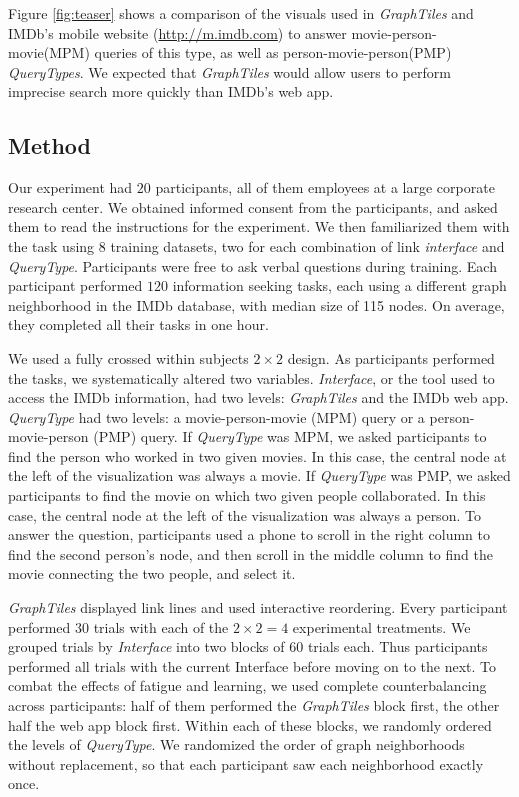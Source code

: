 Figure \ref{fig:teaser} shows a comparison of the visuals used in \textit{GraphTiles} and IMDb's mobile website (\url{http://m.imdb.com}) to answer movie-person-movie(MPM) queries of this type, as well as person-movie-person(PMP) \textit{QueryTypes}. We expected that \textit{GraphTiles} would allow users to perform imprecise search more quickly than IMDb's web app.


\subsection{Method}

Our experiment had $20$ participants, all of them employees at a large corporate research center.  We obtained informed consent from the participants, and asked them to read the instructions for the experiment. We then familiarized them with the task using 8 training datasets, two for each combination of link \textit{interface} and \textit{QueryType}. Participants were free to ask verbal questions during training. Each participant performed $120$ information seeking tasks, each using a different graph neighborhood in the IMDb database, with median size of 115 nodes. On average, they completed all their tasks in one hour.

We used a fully crossed within subjects $2 \times 2$ design. As participants performed the tasks, we systematically altered two variables. \textit{Interface}, or the tool used to access the IMDb information, had two levels: \textit{GraphTiles} and the IMDb web app. \textit{QueryType} had two levels: a movie-person-movie (MPM) query or a person-movie-person (PMP) query. If \textit{QueryType} was MPM, we asked participants to find the person who worked in two given movies. In this case, the central node at the left of the visualization was always a movie. If \textit{QueryType} was PMP, we asked participants to find the movie on which two given people collaborated. In this case, the central node at the left of the visualization was always a person. To answer the question, participants used a phone to scroll in the right column to find the second person's node, and then scroll in the middle column to find the movie connecting the two people, and select it.

\textit{GraphTiles} displayed link lines and used interactive reordering. Every participant performed $30$ trials with each of the $2 \times 2 = 4$ experimental treatments. We grouped trials by \textit{Interface} into two blocks of $60$ trials each. Thus participants performed all trials with the current Interface before moving on to the next. To combat the effects of fatigue and learning, we used complete counterbalancing across participants: half of them performed the \textit{GraphTiles} block first, the other half the web app block first. Within each of these blocks, we randomly ordered the levels of \textit{QueryType}. We randomized the order of graph neighborhoods without replacement, so that each participant saw each neighborhood exactly once.

